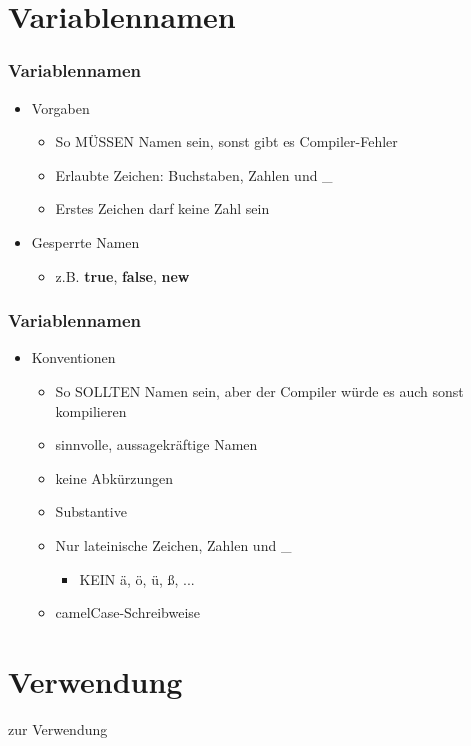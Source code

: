 \documentclass[final]{beamer}
\newcommand{\keyWord}[1]{\textbf{#1}}
\begin{document}
\section{Variablennamen}
\begin{frame}[fragile]
  \frametitle{Variablennamen}
  \begin{itemize}
    \item Vorgaben
    \begin{itemize}
      \item So MÜSSEN Namen sein, sonst gibt es Compiler-Fehler
      \item Erlaubte Zeichen: Buchstaben, Zahlen und \_
      \item Erstes Zeichen darf keine Zahl sein
    \end{itemize}
    \item Gesperrte Namen
      \begin{itemize}
        \item z.B. \keyWord{true}, \keyWord{false}, \keyWord{new}
      \end{itemize}
  \end{itemize}
\end{frame}

\begin{frame}
  \frametitle{Variablennamen}
  \begin{itemize}
    \item Konventionen
    \begin{itemize}
      \item So SOLLTEN Namen sein, aber der Compiler würde es auch sonst kompilieren
      \item sinnvolle, aussagekräftige Namen
      \item keine Abkürzungen
      \item Substantive
      \item Nur lateinische Zeichen, Zahlen und \_
      \begin{itemize}
        \item KEIN ä, ö, ü, ß, ...
      \end{itemize}
      \item camelCase-Schreibweise
    \end{itemize}
  \end{itemize}
\end{frame}

\section{Verwendung}
\begin{frame}
  \begin{center}
    \Huge{zur Verwendung}
  \end{center}
\end{frame}
\end{document}
